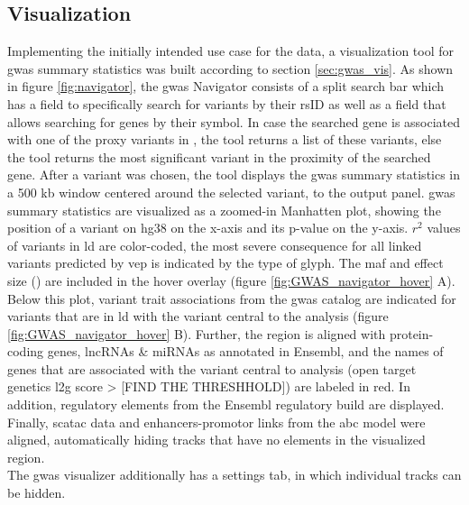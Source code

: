     \subsection{Visualization}
    \label{subsec:result_vis}
    Implementing the initially intended use case for the data, a visualization tool for \ac{gwas} summary statistics was built according to section \ref{sec:gwas_vis}. As shown in figure \ref{fig:navigator}, the \ac{gwas} Navigator consists of a split search bar which has a field to specifically search for variants by their rsID as well as a field that allows searching for genes by their symbol. In case the searched gene is associated with one of the proxy variants in \textcite{aragamDiscoverySystematicCharacterization2021}, the tool returns a list of these variants, else the tool returns the most significant variant in the proximity of the searched gene. After a variant was chosen, the tool displays the \ac{gwas} summary statistics in a 500 kb window centered around the selected variant, to the output panel. \ac{gwas} summary statistics are visualized as a zoomed-in Manhatten plot, showing the position of a variant on \ac{hg38} on the x-axis and its p-value on the y-axis. $r^2$ values of variants in \ac{ld} are color-coded, the most severe consequence for all linked variants predicted by \ac{vep} is indicated by the type of glyph. The \ac{maf} and effect size (\beta) are included in the hover overlay (figure \ref{fig:GWAS_navigator_hover} A). Below this plot, variant trait associations from the \ac{gwas} catalog are indicated for variants that are in \ac{ld} with the variant central to the analysis (figure \ref{fig:GWAS_navigator_hover} B). Further, the region is aligned with protein-coding genes, lncRNAs \& miRNAs as annotated in Ensembl, and the names of genes that are associated with the variant central to analysis (open target genetics \ac{l2g} score > [FIND THE THRESHHOLD]) are labeled in red. In addition, regulatory elements from the Ensembl regulatory build are displayed. Finally, sc\ac{atac} data and enhancers-promotor links from the \ac{abc} model were aligned, automatically hiding tracks that have no elements in the visualized region.\\
    The \ac{gwas} visualizer additionally has a settings tab, in which individual tracks can be hidden.

